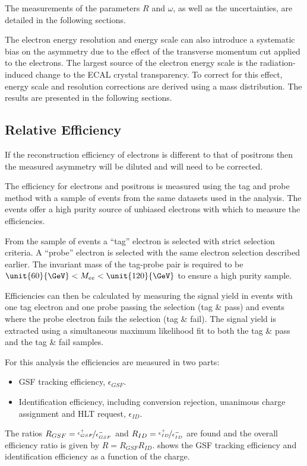 The measurements of the parameters $R$ and $\omega$, as well as the
uncertainties, are detailed in the following sections.

The electron energy resolution and energy scale can also introduce a systematic
bias on the asymmetry due to the effect of the transverse momentum cut applied
to the electrons. The largest source of the electron energy scale is the
radiation-induced change to the ECAL crystal transparency.  To correct for this
effect, energy scale and resolution corrections are derived using a \Zee mass
distribution. The results are presented in the following sections.

\subsection{Relative Efficiency}

If the reconstruction efficiency of electrons is different to that of
positrons then the measured asymmetry will be diluted and will need to be
corrected.

The efficiency for electrons and positrons is measured using the tag and probe
method \cite{adam2009tag} with a sample of \Zee events from the same datasets
used in the analysis.  The \Zee events offer a high purity source of unbiased
electrons with which to measure the efficiencies.

From the sample of \Zee events a ``tag'' electron is selected with strict
selection criteria. 
A ``probe'' electron is selected with the same electron selection described
earlier.
The invariant mass of the tag-probe pair is required to be
$\unit{60}{\GeV} < M_{ee} < \unit{120}{\GeV}$ to ensure a high purity sample.

Efficiencies can then be calculated by measuring the signal yield in events
with one tag electron and one probe passing the selection (tag \& pass) and
events where the probe electron fails the selection (tag \& fail).
The signal yield is extracted using a simultaneous maximum likelihood fit to
both the tag \& pass and the tag \& fail samples.

For this analysis the efficiencies are measured in two parts:

\begin{itemize}
    \item GSF tracking efficiency, $\epsilon_{GSF}$.
    \item Identification efficiency, including conversion rejection, unanimous
charge assignment and HLT request, $\epsilon_{ID}$.
\end{itemize}
The ratios $R_{GSF} = \nicefrac{\epsilon^{+}_{GSF}}{\epsilon^{-}_{GSF}}$ and
$R_{ID} = \nicefrac{\epsilon^{+}_{ID}}{\epsilon^{-}_{ID}}$ are found and the
overall efficiency ratio is given by $R = R_{GSF} R_{ID}$.
 shows the GSF tracking efficiency and identification 
efficiency as a function of the charge.

